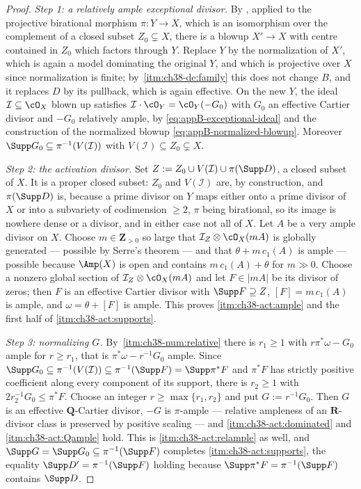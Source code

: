 \begin{proof}
\emph{Step 1: a relatively ample exceptional divisor.}
By , applied to the projective
birational morphism $\pi:Y\to X$, which is an isomorphism over the
complement of a closed subset $Z_0\subsetneq X$, there is a blowup
$X'\to X$ with centre contained in $Z_0$ which factors through $Y$.
Replace $Y$ by the normalization of $X'$, which is again a model
dominating the original $Y$, and which is projective over $X$ since
normalization is finite; by
\,\cref{itm:ch38-de:family} this
does not change $B$, and it replaces $D$ by its pullback, which is
again effective.  On the new $Y$, the ideal $\mathcal I\subseteq\cO_X$
blown up satisfies $\mathcal I\cdot\cO_Y=\cO_Y(-G_0)$ with $G_0$ an
effective Cartier divisor and $-G_0$ relatively ample, by
\eqref{eq:appB-exceptional-ideal} and the construction of the normalized
blowup \eqref{eq:appB-normalized-blowup}.  Moreover
$\Supp G_0\subseteq\pi^{-1}(V(\mathcal I))$ with
$V(\mathcal I)\subseteq Z_0\subsetneq X$.

\emph{Step 2: the activation divisor.}
Set $Z:=Z_0\cup V(\mathcal I)\cup\pi(\Supp D)$, a closed subset of
$X$.  It is a proper closed subset: $Z_0$ and $V(\mathcal I)$ are,
by construction, and $\pi(\Supp D)$ is, because a prime divisor on $Y$
maps either onto a prime divisor of $X$ or into a subvariety of
codimension $\geq2$, $\pi$ being birational, so its image is nowhere
dense or a divisor, and in either case not all of $X$.  Let $A$ be a
very ample divisor on $X$.  Choose $m\in\mathbf Z_{>0}$ so large that
$\mathcal I_Z\otimes\cO_X(mA)$ is globally generated --- possible by
Serre's theorem --- and that $\theta+m\,c_1(A)$ is ample --- possible
because $\Amp(X)$ is open and contains $m\,c_1(A)+\theta$ for
$m\gg0$.  Choose a nonzero global section of
$\mathcal I_Z\otimes\cO_X(mA)$ and let $F\in|mA|$ be its divisor of
zeros; then $F$ is an effective Cartier divisor with
$\Supp F\supseteq Z$, $[F]=m\,c_1(A)$ is ample, and
$\omega=\theta+[F]$ is ample.  This proves
\cref{itm:ch38-act:ample} and the first half of
\cref{itm:ch38-act:supports}.

\emph{Step 3: normalizing $G$.}
By \,\cref{itm:ch38-num:relative} there
is $r_1\geq1$ with $r\pi^*\omega-G_0$ ample for $r\geq r_1$, that is
$\pi^*\omega-r^{-1}G_0$ ample.  Since
$\Supp G_0\subseteq\pi^{-1}(V(\mathcal I))\subseteq\pi^{-1}(\Supp F)
=\Supp\pi^*F$ and $\pi^*F$ has strictly positive coefficient along every
component of its support, there is $r_2\geq1$ with
$2r_2^{-1}G_0\leq\pi^*F$.  Choose an integer
$r\geq\max\{r_1,r_2\}$ and put $G:=r^{-1}G_0$.  Then $G$ is an effective
$\mathbf Q$-Cartier divisor, $-G$ is $\pi$-ample --- relative
ampleness of an $\mathbf R$-divisor class is preserved by positive
scaling --- and \cref{itm:ch38-act:dominated} and
\cref{itm:ch38-act:Qample} hold.  This is \cref{itm:ch38-act:relample} as
well, and $\Supp G=\Supp G_0\subseteq\pi^{-1}(\Supp F)$ completes
\cref{itm:ch38-act:supports}, the equality
$\Supp D'=\pi^{-1}(\Supp F)$ holding because
$\Supp\pi^*F=\pi^{-1}(\Supp F)$ contains $\Supp D$.


\end{proof}
